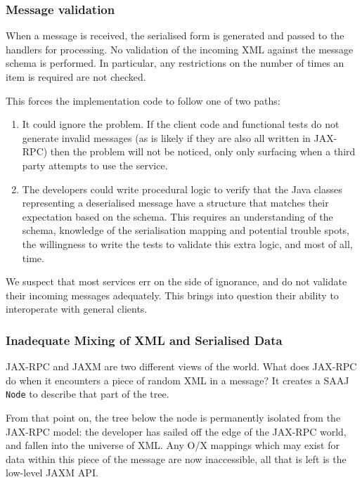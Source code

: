 \subsubsection{Message validation}
\label{objections:o-x:validation}

When a message is received, the serialised form is generated and
passed to the handlers for processing. No validation of the incoming
XML against the message schema is performed. In particular, any
restrictions on the number of times an item is required are not
checked.

This forces the implementation code to follow one of two paths:
\begin{enumerate}
\item It could ignore the problem. If the client code and functional
tests do not generate invalid messages (as is likely if they are also
all written in JAX-RPC) then the problem will not be noticed, only
only surfacing when a third party attempts to use the service.

\item The developers could write procedural logic to verify that
the Java classes representing a deserialised message have a
structure that matches their expectation based on the schema. This
requires an understanding of the schema, knowledge of the
serialisation mapping and potential trouble spots, the willingness to
write the tests to validate this extra logic, and most of all, time.
\end{enumerate}

We suspect that most services err on the side of ignorance, and do not
validate their incoming messages adequately. This brings into question
their ability to interoperate with general clients.

\subsubsection{Inadequate Mixing of XML and Serialised Data}
\label{objections:o-x:mixing}

JAX-RPC and JAXM are two different views of the world. What does JAX-RPC
do when it encounters a piece of random XML in a message? It creates a
SAAJ {\tt Node} to describe that part of the tree.

From that point on, the tree below the node is permanently isolated
from the JAX-RPC model: the developer has sailed off the edge of the
JAX-RPC world, and fallen into the universe of XML. Any O/X mappings
which may exist for data within this piece of the message are now
inaccessible, all that is left is the low-level JAXM API. 

